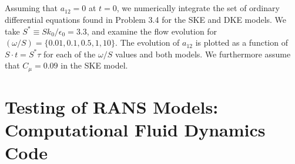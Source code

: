 \documentclass[11pt]{article}
\begin{document}
\subsection{}

Assuming that $a_{12}=0$ at $t=0$, we numerically integrate the set of ordinary differential equations found in Problem 3.4 for the SKE and DKE models. We take $S^* \equiv S k_0 / \epsilon_0 = 3.3$, and examine the flow evolution for $(\omega/S) = \{0.01,0.1,0.5,1,10\}$. The evolution of $a_{12}$ is plotted as a function of $S \cdot t = S^* \tau$ for each of the $\omega/S$ values and both models. We furthermore assume that $C_\mu = 0.09$ in the SKE model.

\subsection{}

\subsection{}

\section{Testing of RANS Models: Computational Fluid Dynamics Code}

\subsection{}

\end{document}
